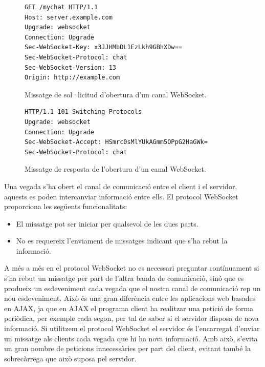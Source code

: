 \begin{figure}[htbp]
\centering
\begin{verbatim}
GET /mychat HTTP/1.1
Host: server.example.com
Upgrade: websocket
Connection: Upgrade
Sec-WebSocket-Key: x3JJHMbDL1EzLkh9GBhXDw==
Sec-WebSocket-Protocol: chat
Sec-WebSocket-Version: 13
Origin: http://example.com
\end{verbatim}
\caption{Missatge de sol·licitud d'obertura d'un canal WebSocket.}
\label{fig:websocket-request}
\end{figure} 

\begin{figure}[htbp]
\centering
\begin{verbatim}
HTTP/1.1 101 Switching Protocols
Upgrade: websocket
Connection: Upgrade
Sec-WebSocket-Accept: HSmrc0sMlYUkAGmm5OPpG2HaGWk=
Sec-WebSocket-Protocol: chat
\end{verbatim}
\caption{Missatge de resposta de l'obertura d'un canal WebSocket.}
\label{fig:websocket-response}
\end{figure} 

Una vegada s'ha obert el canal de comunicació entre el client i el servidor, aquests es poden intercanviar informació entre ells. El protocol WebSocket proporciona les següents funcionalitats: 

\begin{itemize}
    \item{El missatge pot ser iniciar per qualsevol de les dues parts.}
    \item{No es requereix l'enviament de missatges indicant que s'ha rebut la informació.}
\end{itemize}

A més a més en el protocol WebSocket no es necessari preguntar contínuament si s'ha rebut un missatge per part de l'altra banda de comunicació, sinó que es produeix un esdeveniment cada vegada que el nostra canal de comunicació rep un nou esdeveniment. Això és una gran diferència entre les aplicacions web basades en AJAX, ja que en AJAX el programa client ha realitzar una petició de forma periòdica, per exemple cada segon, per tal de saber si el servidor disposa de nova informació. Si utilitzem el protocol WebSocket el servidor és l'encarregat d'enviar un missatge als clients cada vegada que hi ha nova informació. Amb això, s'evita un gran nombre de peticions innecessàries per part del client, evitant també la sobrecàrrega que això suposa pel servidor.

